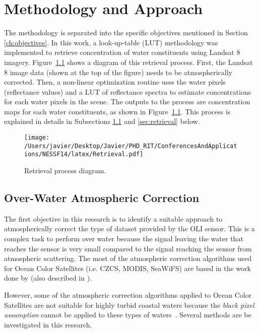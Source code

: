 \chapter{Methodology and Approach}
\label{ch:method}

The methodology is separated into the specific objectives mentioned in Section \ref{ch:objectives}. In this work, a look-up-table (LUT) methodology was implemented to retrieve concentration of water constituents using Landsat 8 imagery. Figure~\ref{fig:retrieval} shows a diagram of this retrieval process. First, the Landsat 8 image data (shown at the top of the figure) needs to be atmospherically corrected. Then, a non-linear optimization routine uses the water pixels (reflectance values) and a LUT of reflectance spectra to estimate concentrations for each water pixels in the scene. The outputs to the process are concentration maps for each water constituents, as shown in Figure~\ref{fig:retrieval}. This process is explained in details in Subsections \ref{sec:atmcorr} and \ref{sec:retrieval} below.
\begin{figure}[htb]
  \centering
  \texttt{[image: /Users/javier/Desktop/Javier/PHD\_RIT/ConferencesAndApplications/NESSF14/latex/Retrieval.pdf]}
  \caption{Retrieval process diagram. \label{fig:retrieval} } 
\end{figure}

\section{Over-Water Atmospheric Correction} 
\label{sec:atmcorr}
The first objective in this research is to identify a suitable approach to atmospherically correct the type of dataset provided by the OLI sensor. This is a complex task to perform over water because the signal leaving the water that reaches the sensor is very small compared to the signal reaching the sensor from atmospheric scattering. The most of the atmospheric correction algorithms used for Ocean Color Satellites (i.e. CZCS, MODIS, SeaWiFS) are based in the work done by \cite{Gordon:1994} (also described in \cite{Gordon:1997}).

However, some of the atmospheric correction algorithms applied to Ocean Color Satellites are not suitable for highly turbid coastal waters because the {\it black pixel assumption} cannot be applied to these types of waters~\cite{Patt2003}. Several methods are be investigated in this research.

